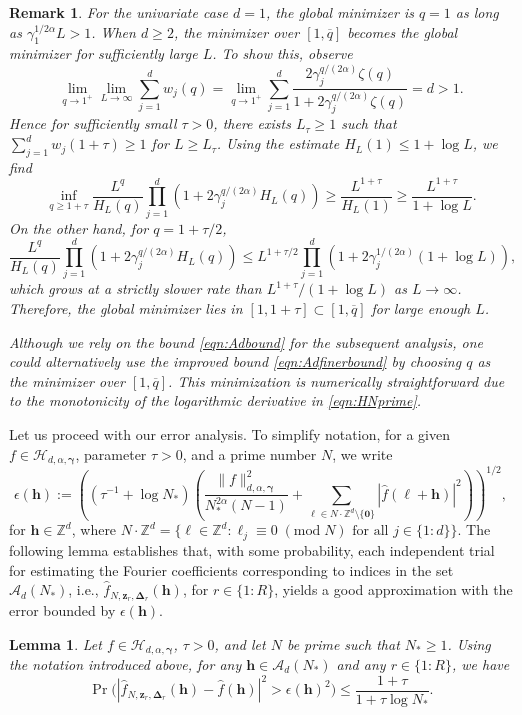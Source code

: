 \documentclass[pdflatex,sn-basic,Numbered]{sn-jnl}%
\newcommand{\bszero}{\boldsymbol{0}}
\newcommand{\bsh}{\boldsymbol{h}}
\newcommand{\bsl}{\boldsymbol{\ell}}
\newcommand{\bsz}{\boldsymbol{z}}
\newcommand{\bsgamma}{\boldsymbol{\gamma}}
\newcommand{\bsDelta}{\boldsymbol{\Delta}}
\newcommand{\ZZ}{\mathbb{Z}}
\newcommand{\Acal}{\mathcal{A}}
\newcommand{\Hcal}{\mathcal{H}}
\newcommand{\tmod}[1]{{\;(\text{mod}\; #1)}}
\theoremstyle{thmstyleone}%
\newtheorem{remark}[theorem]{Remark}
\newtheorem{lemma}[theorem]{Lemma}
\theoremstyle{thmstyletwo}%
\begin{document}
\begin{remark}
For the univariate case $d=1$, the global minimizer is $q=1$ as long as $\gamma^{1/2\alpha}_1 L>1$. When $d\ge 2$, the minimizer over $[1,\overline{q}]$ becomes the global minimizer for sufficiently large $L$. To show this, observe
\[ \lim_{q\to 1^+}\lim_{L\to\infty}\sum_{j=1}^d w_j(q)=\lim_{q\to 1^+}\sum_{j=1}^d \frac{2\gamma^{q/(2\alpha)}_j  \zeta(q)}{1+2\gamma^{q/(2\alpha)}_j  \zeta(q)}=d>1.\]
Hence for sufficiently small $\tau>0$, there exists $L_\tau \ge 1$ 
such that $\sum_{j=1}^d w_j(1+\tau)\geq 1$ for $L\geq L_\tau$. Using the estimate $H_L(1)\leq 1+ \log L$, we find
\[ \inf_{q\geq 1+\tau}  \frac{L^{q}}{ H_{L}(q)} \prod_{j=1}^d \left(1+2\gamma^{q/(2\alpha)}_j  H_{L}(q)\right)\geq \frac{L^{1+\tau}}{H_{L}(1)}\geq \frac{L^{1+\tau}}{1+ \log L}. \]
On the other hand, for $q=1+\tau/2$,
\[ \frac{L^{q}}{ H_{L}(q)} \prod_{j=1}^d \left(1+2\gamma^{q/(2\alpha)}_j  H_{L}(q)\right)\leq L^{1+\tau/2}\prod_{j=1}^d \left(1+2\gamma^{1/(2\alpha)}_j  (1+ \log L)\right), \]
which grows at a strictly slower rate than $L^{1+\tau}/(1+ \log L)$ as $L\to \infty$. Therefore, the global minimizer lies in $[1,1+\tau]\subset [1,\overline{q}]$ for large enough $L$. 

Although we rely on the bound \eqref{eqn:Adbound} for the subsequent analysis, one could alternatively use the improved bound \eqref{eqn:Adfinerbound} by choosing $q$ as the minimizer over $[1, \overline{q}]$. This minimization is numerically straightforward due to the monotonicity of the logarithmic derivative in \eqref{eqn:HNprime}.
\end{remark}


Let us proceed with our error analysis. To simplify notation, for a given $f\in\Hcal_{d,\alpha,\bsgamma}$, parameter $\tau>0$, and a prime number $N$, we write
\[ 
\epsilon(\bsh):=\left((\tau^{-1}+\log N_*) \left(\frac{\|f\|^2_{d,\alpha,\bsgamma}}{N_*^{2\alpha}(N-1) }+\sum_{\bsl \in N\cdot \ZZ^d\setminus \{\bszero\} }|\widehat{f}(\bsl+\bsh)|^2\right)\right)^{1/2},
\]
for $\bsh\in \ZZ^d$, where $N\cdot \ZZ^d=\{\bsl\in \ZZ^d : \ell_j \equiv 0 \tmod N \text{ for all } j\in \{1{:}d\}\}$. The following lemma establishes that, with some probability, each independent trial for estimating the Fourier coefficients corresponding to indices in the set $\Acal_d(N_*)$, i.e., $\widehat{f}_{N,\bsz_r,\bsDelta_r}(\bsh)$, for $r\in \{1{:}R\}$, yields a good approximation with the error bounded by $\epsilon(\bsh)$. 

\begin{lemma}\label{lem:concentration}
    Let $f\in\Hcal_{d,\alpha,\bsgamma}$, $\tau>0$, and let $N$ be prime such that $N_*\geq 1$.
    Using the notation introduced above, for any 
    $\bsh\in\Acal_d (N_*)$ and any $r\in\{1{:}R\}$, we have
    \[ 
    \Pr\Big(|\widehat{f}_{N,\bsz_r,\bsDelta_r}(\bsh)-\widehat{f}(\bsh)|^2>\epsilon(\bsh)^2\Big)
    \le  \frac{1+\tau}{1+\tau\log N_* }.
    \]
\end{lemma}
\end{document}
